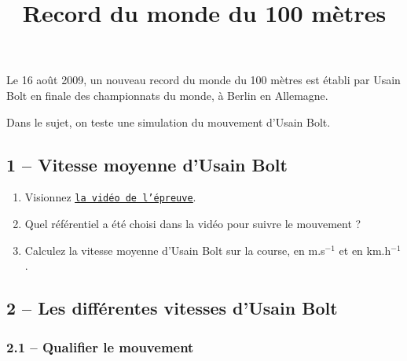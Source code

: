\documentclass[11pt]{article}
\title{Record du monde du 100 mètres}\author{}\date{}
\begin{document}
\maketitle
\thispagestyle{fancy}

\vspace{-1cm}
Le 16 août 2009, un nouveau record du monde du 100 mètres est établi par Usain Bolt en finale des championnats du monde, à Berlin en Allemagne.

Dans le sujet, on teste une simulation du mouvement d'Usain Bolt.



\subsection*{1 -- Vitesse moyenne d'Usain Bolt}

\begin{enumerate}
	\item Visionnez \href{https://github.com/formationPythonPC/formation20-21/tree/master/activites-2nde/2-tp-bolt/Bolt2.avi}{\underline{\texttt{la vidéo de l'épreuve}}}.
 
 \smallskip
 \item \ar Quel référentiel a été choisi dans la vidéo pour suivre le mouvement ?
 
 \medskip
 
 \item \rea Calculez la vitesse moyenne d'Usain Bolt sur la course, en m.s$^{-1}$ et en km.h$^{-1}$. 
\end{enumerate}


\subsection*{2 -- Les différentes vitesses d'Usain Bolt}

\subsubsection*{2.1 -- Qualifier le mouvement}
\end{document}
